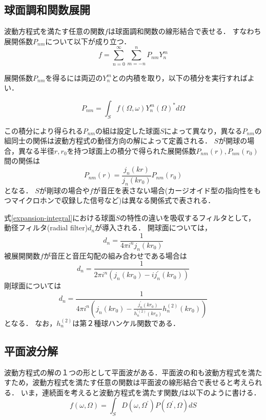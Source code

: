 \documentclass[a4paper]{jsarticle}
\begin{document}
\subsection{球面調和関数展開}
波動方程式を満たす任意の関数$f$は球面調和関数の線形結合で表せる．
すなわち展開係数$P_{nm}$について以下が成り立つ．
\begin{equation}
    \label{spherical-expansion}
    f=\sum_{n=0}^{\infty} \sum_{m=-n}^{n} P_{n m} Y_{n}^{m}
\end{equation}

展開係数$P_{nm}$を得るには両辺の$Y_{n}^{m}$との内積を取り，以下の積分を実行すればよい．

\begin{equation}
    \label{expansion-integral}
    P_{n m}=\int_{S} f(\Omega, \omega) Y_{n}^{m}(\Omega)^{*} d \Omega
\end{equation}

この積分により得られる$P_{nm}$の組は設定した球面$S$によって異なり，異なる$P_{nm}$の組同士の関係は波動方程式の動径方向の解によって定義される．
$S$が開球の場合，異なる半径$r, r_0$を持つ球面上の積分で得られた展開係数$P_{nm}(r), P_{nm}(r_0)$間の関係は
$$
    P_{n m}(r)=\frac{j_{n}(k r)}{j_{n}\left(k r_{0}\right)} P_{n m}\left(r_{0}\right)
$$
となる\cite{EGW99}．
$S$が剛球の場合や$f$が音圧を表さない場合(カージオイド型の指向性をもつマイクロホンで収録した信号など)は異なる関係式で表される．

式\ref{expansion-integral}における球面$S$の特性の違いを吸収するフィルタとして，動径フィルタ(radial filter)$d_n$が導入される．
開球面については，
$$
    d_{n}=\frac{1}{4 \pi i^{n} j_{n}\left(k r_{0}\right)}
$$
被展開関数$f$が音圧と音圧勾配の組み合わせである場合は
$$
    d_{n}=\frac{1}{2 \pi i^{n}\left(j_{n}\left(k r_{0}\right)-i j_{n}^{\prime}\left(k r_{0}\right)\right)}
$$
剛球面については
$$
    d_{n}=\frac{1}{4 \pi i^{n}\left(j_{n}\left(k r_{0}\right)-\frac{j_{n}^{\prime}\left(k r_{0}\right)}{h_{n}^{\prime(2)}\left(k r_{0}\right)} h_{n}^{(2)}\left(k r_{0}\right)\right)}
$$
となる．
なお，$h_{n}^{(2)}$は第２種球ハンケル関数である．

\subsection{平面波分解}
波動方程式の解の１つの形として平面波がある．平面波の和も波動方程式を満たすため，波動方程式を満たす任意の関数は平面波の線形結合で表せると考えられる．
いま，連続面を考えると波動方程式を満たす関数$f$は以下のように書ける．
\begin{equation}
    \label{plane-wave-decomposition}
    f(\omega, \Omega)=\int_{S} D\left(\omega, \Omega^{\prime}\right) P\left(\Omega^{\prime}, \Omega\right) d S
\end{equation}
\end{document}
